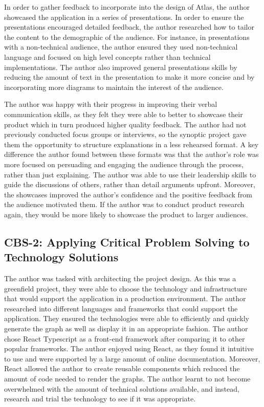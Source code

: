 \documentclass{article}
\begin{document}
In order to gather feedback to incorporate into the design of Atlas, the author showcased the application in a series of presentations. In order to ensure the presentations encouraged detailed feedback, the author researched how to tailor the content to the demographic of the audience. For instance, in  presentations with a non-technical audience, the author ensured they used non-technical language and focused on high level concepts rather than technical implementations. The author also improved general presentations skills by reducing the amount of text in the presentation to make it more concise and by incorporating more diagrams to maintain the interest of the audience. 

The author was happy with their progress in improving their verbal communication skills, as they felt they were able to better to showcase their product which in turn produced higher quality feedback. The author had not previously conducted focus groups or interviews, so the synoptic project gave them the opportunity to structure explanations in a less rehearsed format. A key difference the author found between these formats was that the author's role was more focused on persuading and engaging the audience through the process, rather than just explaining. The author was able to use their leadership skills to guide the discussions of others, rather than detail arguments upfront. Moreover, the showcases improved the author's confidence and the positive feedback from the audience motivated them. If the author was to conduct product research again, they would be more likely to showcase the product to larger audiences.


\subsection{CBS-2: Applying Critical Problem Solving to Technology Solutions}

The author was tasked with architecting the project design. As this was a greenfield project, they were able to choose the technology and infrastructure that would support the application in a production environment. The author researched into different languages and frameworks that could support the application. They ensured the technologies were able to efficiently and quickly generate the graph as well as display it in an appropriate fashion. The author chose React Typescript as a front-end framework after comparing it to other popular frameworks. The author enjoyed using React, as they found it intuitive to use and were supported by a large amount of online documentation. Moreover, React allowed the author to create reusable components which reduced the amount of code needed to render the graphs. The author learnt to not become overwhelmed with the amount of technical solutions available, and instead, research and trial the technology to see if it was appropriate.
\end{document}
